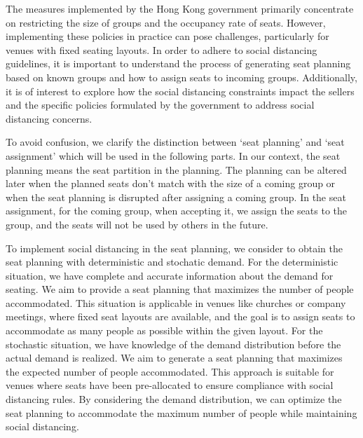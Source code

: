 The measures implemented by the Hong Kong government primarily concentrate on restricting the size of groups and the occupancy rate of seats. However, implementing these policies in practice can pose challenges, particularly for venues with fixed seating layouts. In order to adhere to social distancing guidelines, it is important to understand the process of generating seat planning based on known groups and how to assign seats to incoming groups. Additionally, it is of interest to explore how the social distancing constraints impact the sellers and the specific policies formulated by the government to address social distancing concerns.




To avoid confusion, we clarify the distinction between `seat planning' and `seat assignment' which will be used in the following parts. In our context, the seat planning means the seat partition in the planning. The planning can be altered later when the planned seats don't match with the size of a coming group or when the seat planning is disrupted after assigning a coming group. In the seat assignment, for the coming group, when accepting it, we assign the seats to the group, and the seats will not be used by others in the future.

To implement social distancing in the seat planning, we consider to obtain the seat planning with deterministic and stochatic demand. For the deterministic situation, we have complete and accurate information about the demand for seating. We aim to provide a seat planning that maximizes the number of people accommodated. This situation is applicable in venues like churches or company meetings, where fixed seat layouts are available, and the goal is to assign seats to accommodate as many people as possible within the given layout. For the stochastic situation, we have knowledge of the demand distribution before the actual demand is realized. We aim to generate a seat planning that maximizes the expected number of people accommodated. This approach is suitable for venues where seats have been pre-allocated to ensure compliance with social distancing rules. By considering the demand distribution, we can optimize the seat planning to accommodate the maximum number of people while maintaining social distancing.

